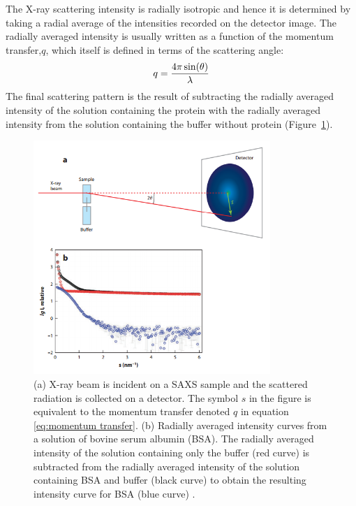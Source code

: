     The X-ray scattering intensity is radially isotropic and hence it is determined by taking a radial average of the intensities recorded on the detector image\cite{franke2015correlation}.
    The radially averaged intensity is usually written as a function of the momentum transfer,$q$, which itself is defined in terms of the scattering angle:
    \begin{equation}
        q = \frac{4 \pi \sin(\theta)}{\lambda}
        \label{eq:momentum transfer}
    \end{equation}
    The final scattering pattern is the result of subtracting the radially averaged intensity of the solution containing the protein with the radially averaged intensity from the solution containing the buffer without protein (Figure~\ref{fig:SAXS scattering curve}).
    \begin{figure}
        \centering
        \includegraphics[width=0.8\textwidth]{figures/introduction/SAXS_scattering.png}
        \caption{(a) X-ray beam is incident on a SAXS sample and the scattered radiation is collected on a detector.
        The symbol $s$ in the figure is equivalent to the momentum transfer denoted $q$ in equation \ref{eq:momentum transfer}. (b) Radially averaged intensity curves from a solution of bovine serum albumin (BSA).
        The radially averaged intensity of the solution containing only the buffer (red curve) is subtracted from the radially averaged intensity of the solution containing BSA and buffer (black curve) to obtain the resulting intensity curve for BSA (blue curve) \cite{blanchet2013small}.}
        \label{fig:SAXS scattering curve}
    \end{figure}

